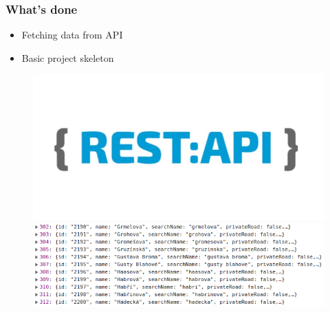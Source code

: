 \documentclass[10pt,xcolor=pdflatex,hyperref={unicode}]{beamer}
\begin{document}
\begin{frame}\frametitle{What's done}
    \begin{itemize}
        \item Fetching data from API
        \item Basic project skeleton
    \end{itemize}
        
    \begin{figure}
        \includegraphics[width=0.4\paperwidth]{img/rest.png}
        \centering
        \includegraphics[width=0.7\paperwidth]{img/Screenshot_2021-10-26_00-14-04.png}
    \end{figure}
\end{frame}
\end{document}
